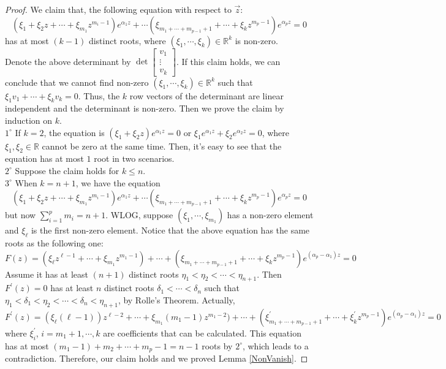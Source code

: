\begin{proof} We claim that, the following equation with respect to $\vec{z}$:
$$(\xi_{1}+\xi_{2}z+\cdots+\xi_{m_1}z^{m_{i}-1})e^{\alpha_{1}z}+\cdots(\xi_{m_{1}+\cdots+m_{p-1}+1}+\cdots+\xi_{k}z^{m_{p}-1})e^{\alpha_{p}z}=0$$ has at most $(k-1)$ distinct roots, where $(\xi_{1},\cdots,\xi_{k})\in\mathbb{R}^{k}$ is non-zero.\\
Denote the above determinant by $\det\left[\begin{smallmatrix} v_{1}\\\vdots\\ v_{k} \end{smallmatrix}\right]$. If this claim holds, we can conclude that we cannot find non-zero $(\xi_{1},\cdots,\xi_{k})\in\mathbb{R}^{k}$ such that $\xi_{1}v_{1}+\cdots+\xi_{k}v_{k}=0$. Thus, the $k$ row vectors of the determinant are linear independent and the determinant is non-zero. Then we prove the claim by induction on $k$.\\
$1^{\circ}$ If $k=2$, the equation is $(\xi_{1}+\xi_{2}z)e^{\alpha_{1}z}=0$ or $\xi_{1}e^{\alpha_{1}z}+\xi_{2}e^{\alpha_{2}z}=0$, where $\xi_{1},\xi_{2}\in\mathbb{R}$ cannot be zero at the same time. Then, it's easy to see that the equation has at most $1$ root in two scenarios.\\
$2^{\circ}$ Suppose the claim holds for $k\leq n$.\\
$3^{\circ}$ When $k=n+1$, we have the equation $$(\xi_{1}+\xi_{2}z+\cdots+\xi_{m_1}z^{m_{i}-1})e^{\alpha_{1}z}+\cdots(\xi_{m_{1}+\cdots+m_{p-1}+1}+\cdots+\xi_{k}z^{m_{p}-1})e^{\alpha_{p}z}=0$$ but now $\sum_{i=1}^{p}m_{i}=n+1$. WLOG, suppose $(\xi_{1},\cdots,\xi_{m_{1}})$ has a non-zero element and $\xi_{\ell}$ is the first non-zero element. Notice that the above equation has the same roots as the following one:
$$F(z)=(\xi_{\ell}z^{\ell-1}+\cdots+\xi_{m_1}z^{m_1-1})+\cdots+(\xi_{m_1+\cdots+m_{p-1}+1}+\cdots+\xi_{k}z^{m_{p}-1})e^{(\alpha_{p}-\alpha_{1})z}=0$$
Assume it has at least $(n+1)$ distinct roots $\eta_{1}<\eta_{2}<\cdots<\eta_{n+1}$. Then $F^{\prime}(z)=0$ has at least $n$ distinct roots $\delta_{1}<\cdots<\delta_{n}$ such that $\eta_{1}<\delta_{1}<\eta_{2}<\cdots<\delta_{n}<\eta_{n+1}$, by Rolle's Theorem. Actually, $F^{\prime}(z)=(\xi_{\ell}(\ell-1))z^{\ell-2}+\cdots+\xi_{m_1}(m_1-1)z^{m_{1}-2})+\cdots+(\xi_{m_1+\cdots+m_{p-1}+1}^{\prime}+\cdots+\xi_{k}^{\prime}z^{m_{p}-1})e^{(\alpha_{p}-\alpha_{1})z}=0$
where $\xi_{i}^{\prime}$, $i=m_1+1,\cdots,k$ are coefficients that can be calculated. This equation has at most $(m_1-1)+m_2+\cdots+m_{p}-1=n-1$ roots by $2^{\circ}$, which leads to a contradiction. Therefore, our claim holds and we proved Lemma \ref{NonVanish}.
\end{proof}

